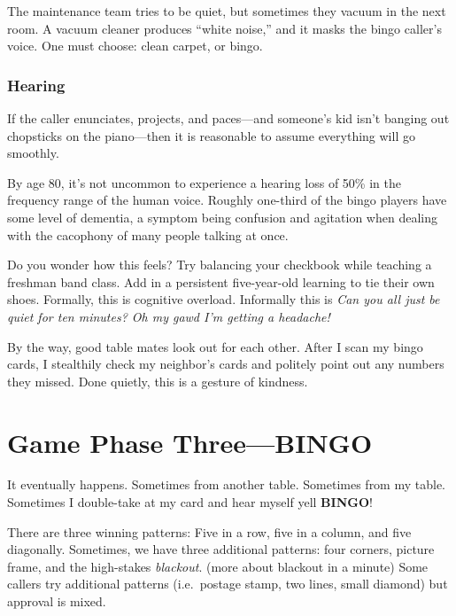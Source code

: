 \documentclass[
  letterpaper,
  DIV=11,
  numbers=noendperiod]{scrreprt}
\begin{document}
The maintenance team tries to be quiet, but sometimes they vacuum in the
next room. A vacuum cleaner produces ``white noise,'' and it masks the
bingo caller's voice. One must choose: clean carpet, or bingo.

\subsubsection*{Hearing}\label{hearing}

If the caller enunciates, projects, and paces---and someone's kid isn't
banging out chopsticks on the piano---then it is reasonable to assume
everything will go smoothly.

By age 80, it's not uncommon to experience a hearing loss of 50\% in the
frequency range of the human voice. Roughly one-third of the bingo
players have some level of dementia, a symptom being confusion and
agitation when dealing with the cacophony of many people talking at
once.

Do you wonder how this feels? Try balancing your checkbook while
teaching a freshman band class. Add in a persistent five-year-old
learning to tie their own shoes. Formally, this is cognitive overload.
Informally this is \emph{Can you all just be quiet for ten minutes? Oh
my gawd I'm getting a headache!}

By the way, good table mates look out for each other. After I scan my
bingo cards, I stealthily check my neighbor's cards and politely point
out any numbers they missed. Done quietly, this is a gesture of
kindness.

\section*{Game Phase Three---BINGO}\label{game-phase-threebingo}


It eventually happens. Sometimes from another table. Sometimes from my
table. Sometimes I double-take at my card and hear myself yell
\textbf{BINGO}!

There are three winning patterns: Five in a row, five in a column, and
five diagonally. Sometimes, we have three additional patterns: four
corners, picture frame, and the high-stakes \emph{blackout}. (more about
blackout in a minute) Some callers try additional patterns (i.e.~postage
stamp, two lines, small diamond) but approval is mixed.
\end{document}
